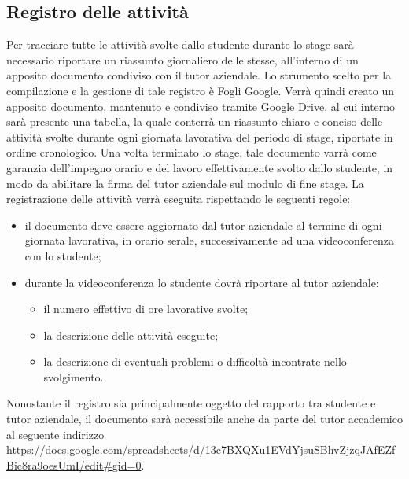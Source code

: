 	\subsection{Registro delle attività}
		Per tracciare tutte le attività svolte dallo studente durante lo stage sarà necessario riportare un riassunto giornaliero delle stesse, all’interno di un apposito documento condiviso con il tutor aziendale.
		\newline
		Lo strumento scelto per la compilazione e la gestione di tale registro è Fogli Google. Verrà quindi creato un apposito documento, mantenuto e condiviso tramite Google Drive, al cui interno sarà presente una tabella, la quale conterrà un riassunto chiaro e conciso delle attività svolte durante ogni giornata lavorativa del periodo di stage, riportate in ordine cronologico.
		\newline
		Una volta terminato lo stage, tale documento varrà come garanzia dell'impegno orario e del lavoro effettivamente svolto dallo studente, in modo da abilitare la firma del tutor aziendale sul modulo di fine stage.
		\newline
		La registrazione delle attività verrà eseguita rispettando le seguenti regole:
		\begin{itemize}
			\item il documento deve essere aggiornato dal tutor aziendale al termine di ogni giornata lavorativa, in orario serale, successivamente ad una videoconferenza con lo studente;
			\item durante la videoconferenza lo studente dovrà riportare al tutor aziendale:
			\begin{itemize}
				\item il numero effettivo di ore lavorative svolte;
				\item la descrizione delle attività eseguite;
				\item la descrizione di eventuali problemi o difficoltà incontrate nello svolgimento.
			\end{itemize}
		\end{itemize}
		Nonostante il registro sia principalmente oggetto del rapporto tra studente e tutor aziendale, il documento sarà accessibile anche da parte del tutor accademico al seguente indirizzo \url{https://docs.google.com/spreadsheets/d/13c7BXQXu1EVdYjsuSBhvZjzqJAfEZfBic8ra9oesUmI/edit#gid=0}.

	
